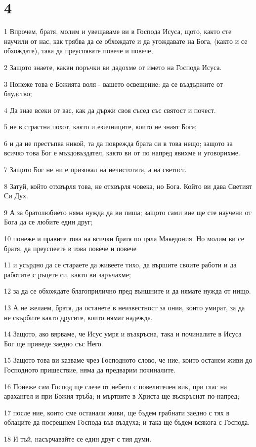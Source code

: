 \chapter{4}

\par 1 Впрочем, братя, молим и увещаваме ви в Господа Исуса, щото, както сте научили от нас, как трябва да се обхождате и да угождавате на Бога, (както и се обхождате), така да преуспявате повече и повече,
\par 2 Защото знаете, какви поръчки ви дадохме от името на Господа Исуса.
\par 3 Понеже това е Божията воля - вашето освещение: да се въздържите от блудство;
\par 4 Да знае всеки от вас, как да държи своя съсед със святост и почест.
\par 5 не в страстна похот, както и езичниците, които не знаят Бога;
\par 6 и да не престъпва никой, та да поврежда брата си в това нещо; защото за всичко това Бог е мъздовъздател, както ви от по напред явихме и уговорихме.
\par 7 Защото Бог не ни е призовал на нечистотата, а на светост.
\par 8 Затуй, който отхвърля това, не отхвърля човека, но Бога. Който ви дава Светият Си Дух.
\par 9 А за братолюбието няма нужда да ви пиша; защото сами вие ще сте научени от Бога да се любите един друг;
\par 10 понеже и правите това на всички братя по цяла Македония. Но молим ви се братя, да преуспеете в това повече и повече
\par 11 и усърдно да се стараете да живеете тихо, да вършите своите работи и да работите с ръцете си, както ви заръчахме;
\par 12 за да се обхождате благоприлично пред външните и да нямате нужда от нищо.
\par 13 А не желаем, братя, да останете в неизвестност за ония, които умират, за да не скърбите както другите, които нямат надежда.
\par 14 Защото, ако вярваме, че Исус умря и възкръсна, така и починалите в Исуса Бог ще приведе заедно със Него.
\par 15 Защото това ви казваме чрез Господното слово, че ние, които останем живи до Господното пришествие, няма да предварим починалите.
\par 16 Понеже сам Господ ще слезе от небето с повелителен вик, при глас на арахангел и при Божия тръба; и мъртвите в Христа ще въскръснат по-напред;
\par 17 после ние, които сме останали живи, ще бъдем грабнати заедно с тях в облаците да посрещнем Господа във въздуха; и така ще бъдем всякога с Господа.
\par 18 И тъй, насърчавайте се един друг с тия думи.

